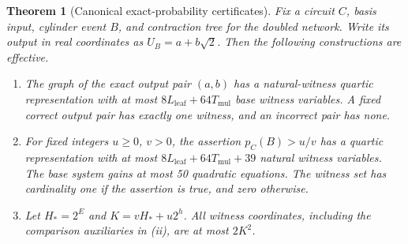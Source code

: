 \documentclass[11pt,letterpaper]{article}
\numberwithin{equation}{section}
\newtheorem{theorem}{Theorem}[section]
\theoremstyle{definition}
\theoremstyle{remark}
\newcommand{\Lleaf}{L_{\mathrm{leaf}}}
\newcommand{\Tmul}{T_{\mathrm{mul}}}
\begin{document}
\begin{theorem}[Canonical exact-probability certificates]
\label{pqc:cc:thm:quantum}
Fix a circuit $C$, basis input, cylinder event $B$, and contraction tree for the
doubled network. Write its output in real coordinates as $U_B=a+b\sqrt2$.
Then the following constructions are effective.
\begin{enumerate}[label=(\roman*)]
\item The graph of the exact output pair $(a,b)$ has a natural-witness quartic
representation with at most $8\Lleaf+64\Tmul$ base witness variables. A fixed correct
output pair has exactly one witness, and an incorrect pair has none.
\item For fixed integers $u\ge0$, $v>0$, the assertion $p_C(B)>u/v$ has a
quartic representation with at most $8\Lleaf+64\Tmul+39$ natural witness variables.
The base system gains at most 50 quadratic equations. The witness set has
cardinality one if the assertion is true, and zero otherwise.
\item Let $H_*=2^E$ and $K=vH_*+u2^h$. All witness coordinates, including the
comparison auxiliaries in (ii), are at most $2K^2$.
\end{enumerate}
\end{theorem}
\end{document}
